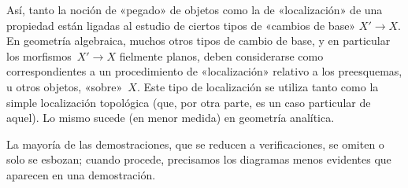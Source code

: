 Así, tanto la noción de «pegado» de objetos como la de «localización» de una
propiedad están ligadas al estudio de ciertos tipos de «cambios de base»
$X'\to X$. En geometría algebraica, muchos otros tipos de cambio de base, y
en particular los morfismos~$X'\to X$ fielmente planos, deben considerarse
como correspondientes a un procedimiento de «localización» relativo a los
preesquemas, u otros objetos, «sobre»~$X$. Este tipo de localización se utiliza
tanto como la simple localización topológica (que, por otra parte, es un caso
particular de aquel). Lo mismo sucede (en menor medida) en geometría analítica.

La mayoría de las demostraciones, que se reducen a verificaciones, se omiten
o solo se esbozan; cuando procede, precisamos los diagramas menos evidentes
que aparecen en una demostración.
